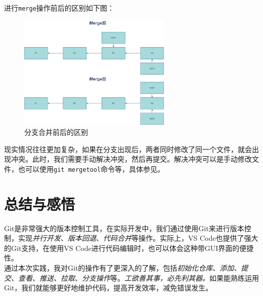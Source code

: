 进行\texttt{merge}操作前后的区别如下图：

\begin{figure}[!h]
    \centering
    \includegraphics[width=0.65\textwidth]{figures/git-branch-1.png}
    \caption{分支合并前后的区别}
    \label{fig:git-branch-merge}
\end{figure}

现实情况往往更加复杂，如果在分支出现后，两者同时修改了同一个文件，就会出现冲突。此时，我们需要手动解决冲突，然后再提交。解决冲突可以是手动修改文件，也可以使用\texttt{git mergetool}命令等，具体参见\citep{MergeConflict}。

\section{总结与感悟}

Git是非常强大的版本控制工具，在实际开发中，我们通过使用Git来进行版本控制，实现\textit{并行开发}、\textit{版本回退}、\textit{代码合并}等操作。实际上，VS Code也提供了强大的Git支持，在使用VS Code进行代码编辑时，也可以体会这种带GUI界面的便捷性。\\

通过本次实践，我对Git的操作有了更深入的了解，包括\textit{初始化仓库}、\textit{添加、提交、查看}、\textit{推送、拉取}、\textit{分支操作}等。\textit{工欲善其事，必先利其器。}如果能熟练运用Git，我们就能够更好地维护代码，提高开发效率，减免错误发生。